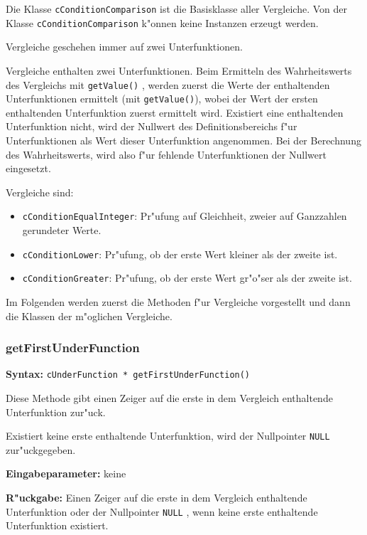 Die Klasse \verb|cConditionComparison| ist die Basisklasse aller Vergleiche. Von der Klasse \verb|cConditionComparison| k"onnen keine Instanzen erzeugt werden.

Vergleiche geschehen immer auf zwei Unterfunktionen.

Vergleiche enthalten zwei Unterfunktionen. Beim Ermitteln des Wahrheitswerts des Vergleichs mit \verb|getValue()| , werden zuerst die Werte der enthaltenden Unterfunktionen ermittelt (mit \verb|getValue()|), wobei der Wert der ersten enthaltenden Unterfunktion zuerst ermittelt wird. Existiert eine enthaltenden Unterfunktion nicht, wird der Nullwert des Definitionsbereichs f"ur Unterfunktionen als Wert dieser Unterfunktion angenommen. Bei der Berechnung des Wahrheitswerts, wird also f"ur fehlende Unterfunktionen der Nullwert eingesetzt.

\bigskip\noindent
Vergleiche sind:
\begin{itemize}
 \item \verb|cConditionEqualInteger|: Pr"ufung auf Gleichheit, zweier auf Ganzzahlen gerundeter Werte.
 \item \verb|cConditionLower|: Pr"ufung, ob der erste Wert kleiner als der zweite ist.
 \item \verb|cConditionGreater|: Pr"ufung, ob der erste Wert gr"o"ser als der zweite ist.
\end{itemize}

Im Folgenden werden zuerst die Methoden f"ur Vergleiche vorgestellt und dann die Klassen der m"oglichen Vergleiche.



\subsubsection{getFirstUnderFunction}

\textbf{Syntax:} \verb|cUnderFunction * getFirstUnderFunction()|

\bigskip\noindent
Diese Methode gibt einen Zeiger auf die erste in dem Vergleich enthaltende Unterfunktion zur"uck.

Existiert keine erste enthaltende Unterfunktion, wird der Nullpointer \verb|NULL| zur"uckgegeben.

\bigskip\noindent
\textbf{Eingabeparameter:} keine

\bigskip\noindent
\textbf{R"uckgabe:} Einen Zeiger auf die erste in dem Vergleich enthaltende Unterfunktion oder der Nullpointer \verb|NULL| , wenn keine erste enthaltende Unterfunktion existiert.


